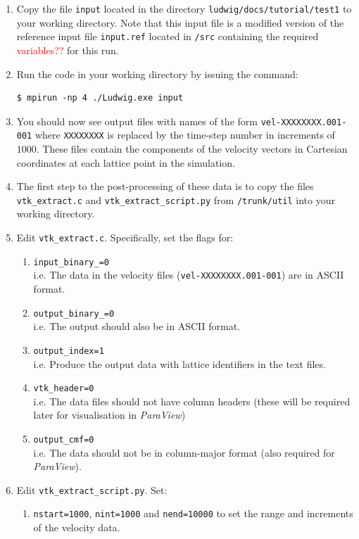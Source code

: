 \documentclass[11pt,twoside,a4paper]{article}
\newcommand{\com}[1]{\textcolor{red}{#1}}
\begin{document}
\begin{enumerate}
\item Copy the file \texttt{input} located in the directory \texttt{ludwig/docs/tutorial/test1} to your working directory. Note that this input file is a modified version of the reference input file \texttt{input.ref} located in \texttt{/src} containing the required \com{variables??} for this run. 
\item Run the code in your working directory by issuing the command:
\begin{lstlisting}
$ mpirun -np 4 ./Ludwig.exe input
\end{lstlisting}
\item You should now see output files with names of the form \texttt{vel-XXXXXXXX.001-001} where \texttt{XXXXXXXX} is replaced by the time-step number in increments of $1000$. These files contain the components of the velocity vectors in Cartesian coordinates at each lattice point in the simulation. 
\item The first step to the post-processing of these data is to copy the files \texttt{vtk\_extract.c} and \texttt{vtk\_extract\_script.py} from \texttt{/trunk/util} into your working directory.
\item Edit \texttt{vtk\_extract.c}. Specifically, set the flags for:
\begin{enumerate}
\item \texttt{input\_binary\_=0} \\ i.e. The data in the velocity files (\texttt{vel-XXXXXXXX.001-001}) are in ASCII format.
\item \texttt{output\_binary\_=0} \\ i.e. The output should also be in ASCII format.
\item \texttt{output\_index=1} \\ i.e. Produce the output data with lattice identifiers in the text files.
\item \texttt{vtk\_header=0} \\ i.e. The data files should not have column headers (these will be required later for visualisation in \textit{ParaView})
\item \texttt{output\_cmf=0} \\ i.e. The data should not be in column-major format (also required for \textit{ParaView}).
\end{enumerate}
\item Edit \texttt{vtk\_extract\_script.py}. Set:
\begin{enumerate}
\item \texttt{nstart=1000}, \texttt{nint=1000} and \texttt{nend=10000} to set the range and increments of the velocity data.

\end{enumerate}
\end{enumerate}
\end{document}
